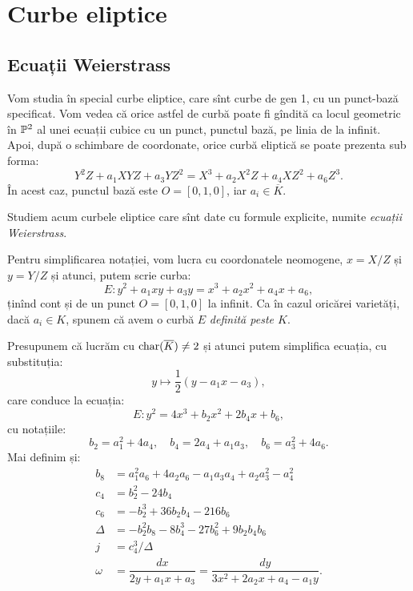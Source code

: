 
\chapter{Curbe eliptice}

\section{Ecuații Weierstrass}

Vom studia în special curbe eliptice, care sînt curbe de gen 1,
cu un punct-bază specificat. Vom vedea că orice astfel de curbă poate
fi gîndită ca locul geometric în $ \mathbb{P}^2 $ al unei ecuații cubice cu un punct,
punctul bază, pe linia de la infinit. Apoi, după o schimbare de coordonate,
orice curbă eliptică se poate prezenta sub forma:
\[
      Y^2Z + a_1 XYZ + a_3 YZ^2 = X^3 + a_2X^2Z + a_4XZ^2 + a_6Z^3.
\]
În acest caz, punctul bază este $ O = [0, 1, 0] $, iar $ a_i \in \overline{K} $.

Studiem acum curbele eliptice care sînt date cu formule explicite,
numite \emph{ecuații Weierstrass}.

Pentru simplificarea notației, vom lucra cu coordonatele neomogene,
$ x = X/Z $ și $ y = Y/Z $ și atunci, putem scrie curba:
\[
      E : y^2 + a_1 xy + a_3 y = x^3 + a_2 x^2 + a_4 x + a_6,
\]
ținînd cont și de un punct $ O = [0, 1, 0] $ la infinit. Ca în cazul
oricărei varietăți, dacă $ a_i \in K $, spunem că avem o curbă $ E $
\emph{definită peste $ K $}.

Presupunem că lucrăm cu $ \mathrm{char}(\overline{K}) \neq 2 $ și atunci
putem simplifica ecuația, cu substituția:
\[
    y \mapsto \dfrac{1}{2} \left( y - a_1x - a_3 \right),
\]
care conduce la ecuația:
\[
      E : y^2 = 4x^3 + b_2 x^2 + 2b_4 x + b_6,
\]
cu notațiile:
\[
      b_2 = a_1^2 + 4a_4, \quad b_4 = 2a_4 + a_1a_3, \quad b_6 = a_3^2 + 4a_6.
\]
Mai definim și:
\begin{align*}
    b_8 &= a_1^2 a_6 + 4a_2a_6 - a_1a_3a_4 + a_2a_3^2 - a_4^2 \\
    c_4 &= b_2^2 - 24b_4 \\
    c_6 &= -b_2^3 + 36b_2b_4 - 216b_6 \\
    \Delta &= -b_2^2b_8 - 8b_4^3 - 27b_6^2 + 9b_2b_4b_6 \\
    j &= c_4^3 / \Delta \\
    \omega &= \dfrac{dx}{2y + a_1x + a_3} = \dfrac{dy}{3x^2 + 2a_2x + a_4 - a_1y}.
\end{align*}


